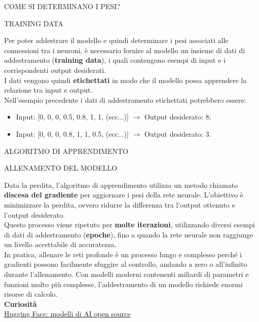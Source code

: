 \documentclass[aspectratio=1610]{beamer}
\begin{document}
\begin{frame}{COME SI DETERMINANO I PESI?}
    \begin{alertblock}{TRAINING DATA}
        \begin{minipage}{0.98\linewidth}
            \justifying
            Per poter addestrare il modello e quindi determinare i pesi associati alle connessioni tra i neuroni, 
            è necessario fornire al modello un insieme di dati di addestramento (\textbf{training data}), i quali 
            contengono esempi di input e i corrispondenti output desiderati.\\
            I dati vengono quindi \textbf{etichettati} in modo che il modello possa apprendere la relazione 
            tra input e output.\\
            Nell'esempio precedente i dati di addestramento etichettati potrebbero essere: 
            \begin{itemize}
                \item Input: [0, 0, 0, 0.5, 0.8, 1, 1, (ecc...)] $\rightarrow$ Output desiderato: 8;
                \item Input: [0, 0, 0, 0.8, 1, 1, 0.5, (ecc...)] $\rightarrow$ Output desiderato: 3.
            \end{itemize}
        \end{minipage}
    \end{alertblock}
\end{frame}

\begin{frame}{ALGORITMO DI APPRENDIMENTO}
    \begin{alertblock}{ALLENAMENTO DEL MODELLO}
        \begin{minipage}{0.98\linewidth}
            \justifying
            Data la perdita, l'algoritmo di apprendimento utilizza un metodo chiamato 
            \textbf{discesa del gradiente} per aggiornare i pesi della rete neurale. 
            L'obiettivo è minimizzare la perdita, ovvero ridurre la differenza tra 
            l'output ottenuto e l'output desiderato.\\
            Questo processo viene ripetuto per \textbf{molte iterazioni}, utilizzando diversi 
            esempi di dati di addestramento (\textbf{epoche}), fino a quando la rete neurale non raggiunge 
            un livello accettabile di accuratezza.\\
            In pratica, allenare le reti profonde è un processo lungo e complesso perché i 
            gradienti possono facilmente sfuggire al controllo, andando a zero o all'infinito durante 
            l'allenamento. Con modelli moderni contenenti miliardi di parametri e funzioni molto più complesse, 
            l'addestramento di un modello richiede enormi risorse di calcolo.\\
            \bigskip
            \tiny{\textbf{Curiosità}}\\
            \tiny{\href{https://huggingface.co/models}{Hugging Face: modelli di AI open source}}
        \end{minipage}
    \end{alertblock}
\end{frame}
\end{document}
